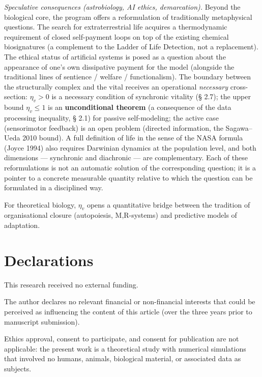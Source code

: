 \documentclass[pdflatex,sn-mathphys-ay]{sn-jnl}
\begin{document}
\emph{Speculative consequences (astrobiology, AI ethics, demarcation).} Beyond the biological core, the program offers a reformulation of traditionally metaphysical questions. The search for extraterrestrial life acquires a thermodynamic requirement of closed self-payment loops on top of the existing chemical biosignatures (a complement to the Ladder of Life Detection, not a replacement). The ethical status of artificial systems is posed as a question about the appearance of one's own dissipative payment for the model (alongside the traditional lines of sentience / welfare / functionalism). The boundary between the structurally complex and the vital receives an operational \emph{necessary} cross-section: \(\eta_v > 0\) is a necessary condition of synchronic vitality (§ 2.7); the upper bound \(\eta_v \le 1\) is an \textbf{unconditional theorem} (a consequence of the data processing inequality, § 2.1) for passive self-modeling; the active case (sensorimotor feedback) is an open problem (directed information, the Sagawa--Ueda 2010 bound). A full definition of life in the sense of the NASA formula (Joyce 1994) also requires Darwinian dynamics at the population level, and both dimensions --- synchronic and diachronic --- are complementary. Each of these reformulations is not an automatic solution of the corresponding question; it is a pointer to a concrete measurable quantity relative to which the question can be formulated in a disciplined way.

For theoretical biology, \(\eta_v\) opens a quantitative bridge between the tradition of organisational closure (autopoiesis, M,R-systems) and predictive models of adaptation.


\backmatter

\section*{Declarations}

This research received no external funding.

The author declares no relevant financial or non-financial interests that could be perceived as influencing the content of this article (over the three years prior to manuscript submission).

Ethics approval, consent to participate, and consent for publication are not applicable: the present work is a theoretical study with numerical simulations that involved no humans, animals, biological material, or associated data as subjects.
\end{document}

